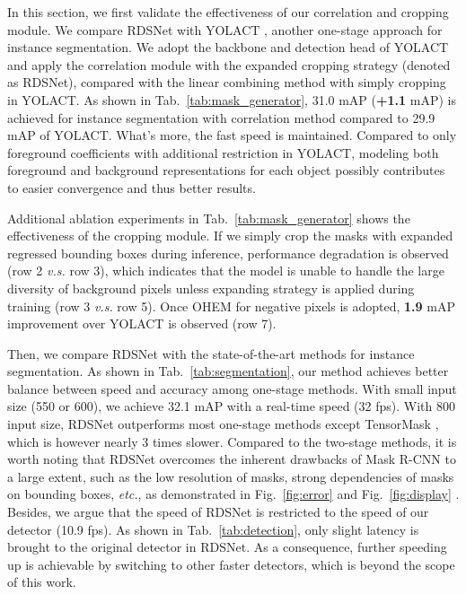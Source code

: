 \documentclass[letterpaper]{article} \usepackage{aaai20}  \usepackage{times}  \usepackage{helvet} \usepackage{courier}  \usepackage[hyphens]{url}  \usepackage{graphicx} \urlstyle{rm} \def\UrlFont{\rm}  \usepackage{graphicx}  \frenchspacing  \setlength{\pdfpagewidth}{8.5in}  \setlength{\pdfpageheight}{11in}
\begin{document}
In this section, we first validate the effectiveness of our correlation and cropping module. We compare RDSNet with YOLACT \cite{dan2019yolact}, another one-stage approach for instance segmentation. We adopt the backbone and detection head of YOLACT and apply the correlation module with the expanded cropping strategy (denoted as RDSNet), compared with the linear combining method with simply cropping in YOLACT. As shown in Tab.~\ref{tab:mask_generator}, 31.0 mAP (\textbf{+1.1} mAP) is achieved for instance segmentation with correlation method compared to 29.9 mAP of YOLACT. What's more, the fast speed is maintained. Compared to only foreground coefficients with additional restriction in YOLACT, modeling both foreground and background representations for each object possibly contributes to easier convergence and thus better results.

Additional ablation experiments in Tab.~\ref{tab:mask_generator} shows the effectiveness of the cropping module. If we simply crop the masks with expanded regressed bounding boxes during inference, performance degradation is observed (row 2 \textit{v.s.} row 3), which indicates that the model is unable to handle the large diversity of background pixels unless expanding strategy is applied during training (row 3 \textit{v.s.} row 5). Once OHEM for negative pixels is adopted, \textbf{1.9} mAP improvement over YOLACT is observed (row 7).


Then, we compare RDSNet with the state-of-the-art methods for instance segmentation. As shown in Tab.~\ref{tab:segmentation}, our method achieves better balance between speed and accuracy among one-stage methods. With small input size (550 or 600), we achieve 32.1 mAP with a real-time speed (32 fps). With 800 input size, RDSNet outperforms most one-stage methods except TensorMask \cite{chen2019tensormask}, which is however nearly 3 times slower. Compared to the two-stage methods, it is worth noting that RDSNet overcomes the inherent drawbacks of Mask R-CNN \cite{he2017mask} to a large extent, such as the low resolution of masks, strong dependencies of masks on bounding boxes, \textit{etc.}, as demonstrated in Fig.~\ref{fig:error} and Fig.~\ref{fig:display} . Besides, we argue that the speed of RDSNet is restricted to the speed of our detector \cite{lin2017focal} (10.9 fps). As shown in Tab.~\ref{tab:detection}, only slight latency is brought to the original detector in RDSNet. As a consequence, further speeding up is achievable by switching to other faster detectors, which is beyond the scope of this work.
\end{document}

